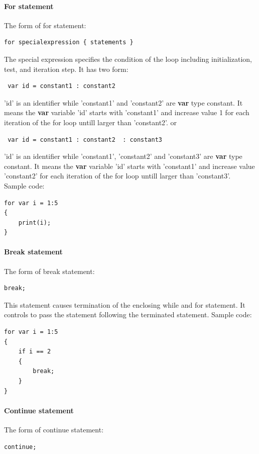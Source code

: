 \documentclass[12pt]{article} %
\begin{document}
\paragraph{For statement}
The form of for statement:
\begin{lstlisting}
for specialexpression { statements }
\end{lstlisting}
\noindent The special expression specifies the condition of the loop including initialization, test, and iteration step. It has two form:
\begin{lstlisting}
 var id = constant1 : constant2
\end{lstlisting}
'id' is an identifier while  'constant1' and 'constant2' are \textbf{var} type constant.  It means the \textbf{var} variable 'id' starts with 'constant1'  and increase value 1 for each iteration of the for loop  untill larger than 'constant2'.
or 
\begin{lstlisting}
 var id = constant1 : constant2  : constant3
\end{lstlisting}
'id' is an identifier while  'constant1', 'constant2' and 'constant3' are \textbf{var} type constant.  It means the \textbf{var} variable 'id' starts with 'constant1'  and increase value 'constant2' for each iteration of the for loop  untill larger than 'constant3'.\\
Sample code:
\begin{lstlisting}
for var i = 1:5
{
	print(i);
}
\end{lstlisting}


\paragraph{Break statement}
The form of break statement:
\begin{lstlisting}
break;
\end{lstlisting}
\noindent This statement causes termination of the enclosing while and for statement. It controls to pass the statement following the terminated statement. Sample code:

\begin{lstlisting}
for var i = 1:5
{
	if i == 2
	{
		break;
	}
}
\end{lstlisting}


\paragraph{Continue statement}
The form of continue statement:

\begin{lstlisting}
continue;
\end{lstlisting}
\end{document}
